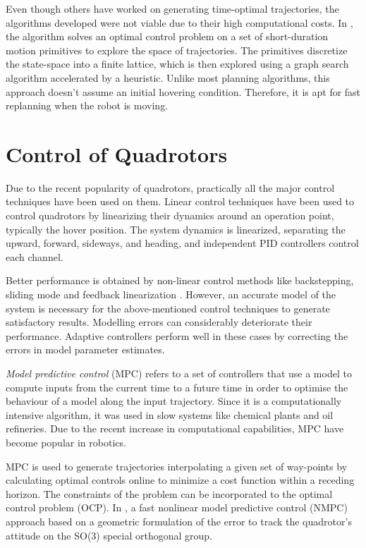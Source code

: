 Even though others have worked on generating time-optimal trajectories, the algorithms developed were not viable due to their high computational costs. In \cite{kumar2017search}, the algorithm solves an optimal control problem on a set of short-duration motion primitives to explore the space of trajectories. The primitives discretize the state-space into a finite lattice, which is then explored using a graph search algorithm accelerated by a heuristic. Unlike most planning algorithms, this approach doesn't assume an initial hovering condition. Therefore, it is apt for fast replanning when the robot is moving.

\section{Control of Quadrotors}
\label{sec:control_quadrotors}
Due to the recent popularity of quadrotors, practically all the major control techniques have been used on them. Linear control techniques \cite{seigwart2004pid} have been used to control quadrotors by linearizing their dynamics around an operation point, typically the hover position. The system dynamics is linearized, separating the upward, forward, sideways, and heading, and independent PID controllers control each channel.

Better performance is obtained by non-linear control methods like backstepping, sliding mode \cite{seigwart2005backstepping} and feedback linearization \cite{lewis2009dynamic}. However, an accurate model of the system is necessary for the above-mentioned control techniques to generate satisfactory results. Modelling errors can considerably deteriorate their performance. Adaptive controllers \cite{kumar2011design} perform well in these cases by correcting the errors in model parameter estimates.

\textit{Model predictive control} (MPC) refers to a set of controllers that use a model to compute inputs from the current time to a future time in order to optimise the behaviour of a model along the input trajectory. Since it is a computationally intensive algorithm, it was used in slow systems like chemical plants and oil refineries. Due to the recent increase in computational capabilities, MPC have become popular in robotics. 

MPC is used to generate trajectories interpolating a given set of way-points \cite{singh2001trajectory} by calculating optimal controls online to minimize a cost function within a receding horizon. The constraints of the problem can be incorporated to the optimal control problem (OCP). In \cite{kamel2015fast}, a fast nonlinear model predictive control (NMPC) approach based on a geometric formulation of the error to track the quadrotor's attitude on the SO(3) special orthogonal group. 

